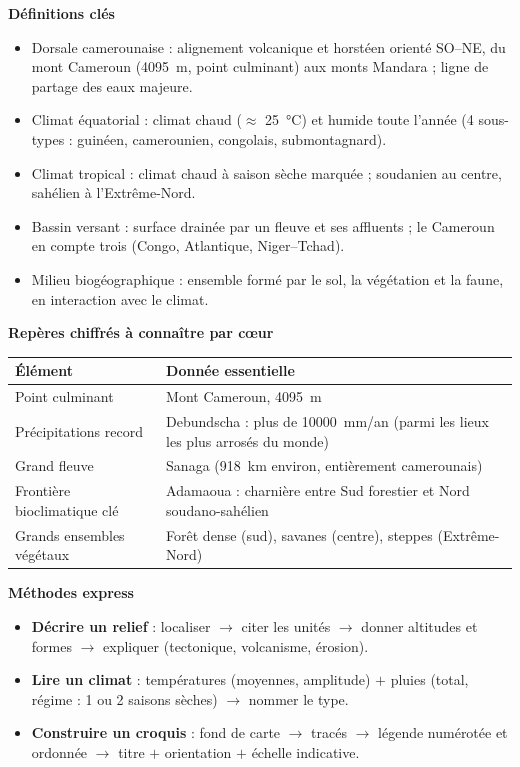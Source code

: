 \documentclass[11pt]{article}
\newcommand{\cle}[1]{{\popxbold\color{popdark}#1}}
\begin{document}
\begin{bilan}
\textbf{Définitions clés}
\begin{itemize}
  \item \cle{Dorsale camerounaise} : alignement volcanique et horstéen orienté SO--NE, du mont Cameroun (\SI{4095}{m}, point culminant) aux monts Mandara ; ligne de partage des eaux majeure.
  \item \cle{Climat équatorial} : climat chaud ($\approx$ \SI{25}{\celsius}) et humide toute l'année (4 sous-types : guinéen, camerounien, congolais, submontagnard).
  \item \cle{Climat tropical} : climat chaud à saison sèche marquée ; soudanien au centre, sahélien à l'Extrême-Nord.
  \item \cle{Bassin versant} : surface drainée par un fleuve et ses affluents ; le Cameroun en compte trois (Congo, Atlantique, Niger--Tchad).
  \item \cle{Milieu biogéographique} : ensemble formé par le sol, la végétation et la faune, en interaction avec le climat.
\end{itemize}

\textbf{Repères chiffrés à connaître par c\oe ur}
\begin{center}
\begin{tabularx}{\linewidth}{|l|X|}\hline
\rowcolor{popblueL} \textbf{Élément} & \textbf{Donnée essentielle} \\ \hline
Point culminant & Mont Cameroun, \SI{4095}{m} \\ \hline
Précipitations record & Debundscha : plus de \SI{10000}{mm/an} (parmi les lieux les plus arrosés du monde) \\ \hline
Grand fleuve & Sanaga (\SI{918}{km} environ, entièrement camerounais) \\ \hline
Frontière bioclimatique clé & Adamaoua : charnière entre Sud forestier et Nord soudano-sahélien \\ \hline
Grands ensembles végétaux & Forêt dense (sud), savanes (centre), steppes (Extrême-Nord) \\ \hline
\end{tabularx}
\end{center}

\textbf{Méthodes express}
\begin{itemize}
  \item \textbf{Décrire un relief} : localiser $\rightarrow$ citer les unités $\rightarrow$ donner altitudes et formes $\rightarrow$ expliquer (tectonique, volcanisme, érosion).
  \item \textbf{Lire un climat} : températures (moyennes, amplitude) $+$ pluies (total, régime : 1 ou 2 saisons sèches) $\rightarrow$ nommer le type.
  \item \textbf{Construire un croquis} : fond de carte $\rightarrow$ tracés $\rightarrow$ légende numérotée et ordonnée $\rightarrow$ titre $+$ orientation $+$ échelle indicative.
\end{itemize}
\end{bilan}
\end{document}
